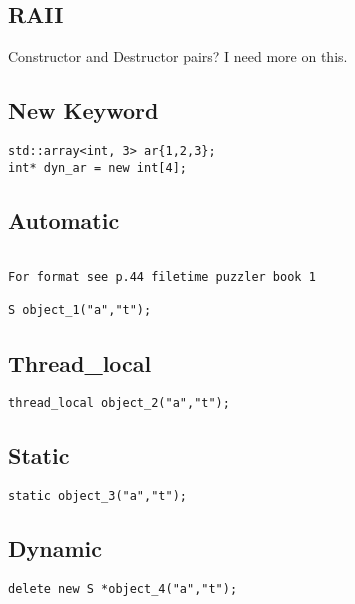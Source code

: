 \subsection{RAII}

Constructor and Destructor pairs? I need more on this.

\subsection{New Keyword}

\begin{verbatim}
std::array<int, 3> ar{1,2,3};
int* dyn_ar = new int[4];
\end{verbatim}



\subsection{Automatic}

\begin{verbatim}

For format see p.44 filetime puzzler book 1

S object_1("a","t");
\end{verbatim}

\subsection{Thread\_local}
\begin{verbatim}
thread_local object_2("a","t");
\end{verbatim}

\subsection{Static}
\begin{verbatim}
static object_3("a","t");
\end{verbatim}

\subsection{Dynamic}

\begin{verbatim}
delete new S *object_4("a","t");
\end{verbatim}

